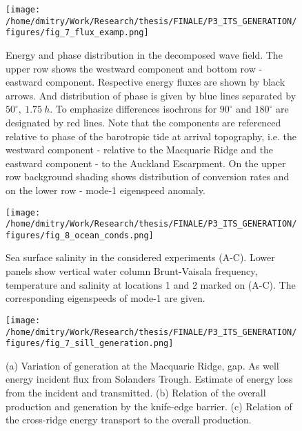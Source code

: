\documentclass[12pt]{article}
\begin{document}
\begin{figure}
	\centering
	\texttt{[image: /home/dmitry/Work/Research/thesis/FINALE/P3\_ITS\_GENERATION/figures/fig\_7\_flux\_examp.png]}
	\caption{Energy and phase distribution in the decomposed wave field. The upper row shows the 
	westward component and bottom row - eastward component. Respective energy fluxes are shown by 
	black arrows. And distribution of phase is given by blue lines separated by 
	$50^{\circ},~1.75~h$. To emphasize differences isochrons for $90^{\circ}$ and $180^{\circ}$ are 
	designated by red lines. Note that the components are referenced relative to phase of the 
	barotropic tide at arrival topography, i.e. the westward component  - relative to the 
	Macquarie Ridge and the eastward component - to the Auckland Escarpment. On the upper row 
	background shading shows distribution of conversion rates and on the lower row - mode-1 
	eigenspeed anomaly.}
	\label{C3.fig:wv_fld_dist}
\end{figure}

\begin{figure}
	\centering
	\texttt{[image: /home/dmitry/Work/Research/thesis/FINALE/P3\_ITS\_GENERATION/figures/fig\_8\_ocean\_conds.png]}
	\caption{Sea surface salinity in the considered experiments (A-C). Lower panels show 
	vertical water column Brunt-Vaisala frequency, temperature and salinity at locations 1 and 2 
	marked on (A-C). The corresponding eigenspeeds of mode-1 are given.}
	\label{C3.fig:ocean_cond}
\end{figure}

\begin{figure}
	\centering
	\texttt{[image: /home/dmitry/Work/Research/thesis/FINALE/P3\_ITS\_GENERATION/figures/fig\_7\_sill\_generation.png]}
	\caption{(a) Variation of generation at the Macquarie Ridge, gap. As well energy incident flux 
	from Solanders Trough. Estimate of energy loss from the incident and transmitted. (b) Relation 
	of the overall production and generation by the knife-edge barrier. (c) Relation of the 
	cross-ridge energy transport to the overall production.}
	\label{C3.fig:gen_dynamics}
\end{figure}

%
\end{document}
